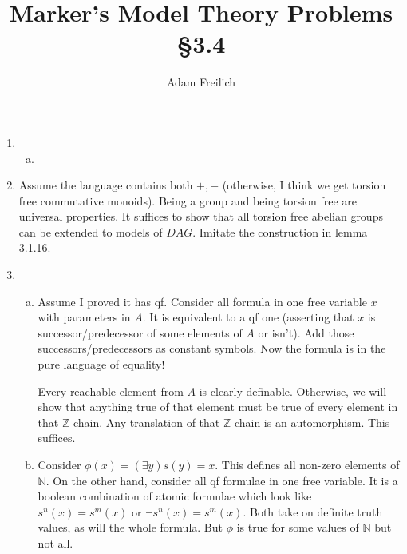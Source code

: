 \documentclass[10pt]{article}
\author{Adam Freilich}
\title{Marker's Model Theory Problems \S 3.4}
\newcommand{\Z}{\mathbb{Z}}
\newcommand{\N}{\mathbb{N}}
\newcommand{\E}{\exists}
\begin{document}
\maketitle


\begin{enumerate}[1.]
\item
 
  \begin{enumerate}[a)] 
  \item 
  \end{enumerate}

\item Assume the language contains both \(+, -\) (otherwise, I think we get torsion free commutative monoids). Being a group and being torsion free are universal properties. It suffices to show that all torsion free abelian groups can be extended to models of \(DAG\). Imitate the construction in lemma 3.1.16.  	

\item
 
  \begin{enumerate}[a)] 
  \item Assume I proved it has qf. Consider all formula in one free variable \(x\) with parameters in \(A\). It is equivalent to a qf one (asserting that \(x\) is successor/predecessor of some elements of \(A\) or isn't). Add those successors/predecessors as constant symbols. Now the formula is in the pure language of equality! 

Every reachable element from \(A\) is clearly definable. Otherwise, we will show that anything true of that element must be true of every element in that \(\Z\)-chain. Any translation of that \(\Z\)-chain is an automorphism. This suffices. 
 
  \item Consider \(\phi(x) = (\E y) s(y) = x\). This defines all non-zero elements of \(\N\). On the other hand, consider all qf formulae in one free variable. It is a boolean combination of atomic formulae which look like \(s^n(x) = s^m(x)\) or \(\neg s^n(x) = s^m(x)\). Both take on definite truth values, as will the whole formula. But \(\phi\) is true for some values of \(\N\) but not all. 


\end{enumerate}
\end{enumerate}
\end{document}
